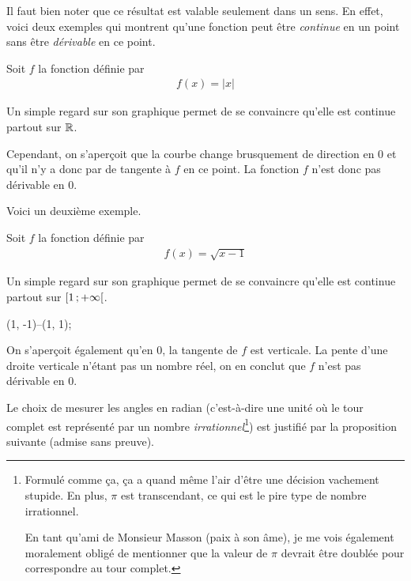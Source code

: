 \documentclass[main.tex]{subfiles}
\begin{document}
Il faut bien noter que ce résultat est valable seulement dans un sens.
En effet, voici deux exemples qui montrent qu'une fonction peut être \emph{continue} en un point sans être \emph{dérivable} en ce point.

\begin{example}
    
    Soit $f$ la fonction définie par 
    \begin{align}
        f(x) = |x|
    \end{align}
    
    Un simple regard sur son graphique permet de se convaincre qu'elle est continue partout sur $\mathbb{R}$.
    \begin{plot}{0.5}{-4}{-1}{4}{4}
    \end{plot}
    
    Cependant, on s'aperçoit que la courbe change brusquement de direction en $0$ et qu'il n'y a donc par de tangente à $f$ en ce point.
    La fonction $f$ n'est donc pas dérivable en $0$.
\end{example}

Voici un deuxième exemple.

\begin{example}
    
    Soit $f$ la fonction définie par 
    \begin{align}
        f(x) = \sqrt {x-1}
    \end{align}
    
    Un simple regard sur son graphique permet de se convaincre qu'elle est continue partout sur $\mathopen{[}1\,;+ \infty\mathclose{[}$.
    \begin{plot}{0.5}{-2}{-2}{6}{4}
        \drawline (1, -1)--(1, 1);
    \end{plot}
    
    On s'aperçoit également qu'en $0$, la tangente de $f$ est verticale.
    La pente d'une droite verticale n'étant pas un nombre réel, on en conclut que $f$ n'est pas dérivable en $0$.
\end{example}

Le choix de mesurer les angles en radian
(c'est-à-dire une unité où le tour complet est représenté par un nombre \emph{irrationnel}\footnote{%
    Formulé comme ça, ça a quand même l'air d'être une décision vachement stupide.
    En plus, $\pi$ est transcendant, ce qui est le pire type de nombre irrationnel.

    En tant qu'ami de Monsieur Masson (paix à son âme),
    je me vois également moralement obligé de mentionner
    que la valeur de $\pi$ devrait être doublée pour correspondre au tour complet.
})
est justifié par la proposition suivante (admise sans preuve).
\end{document}
